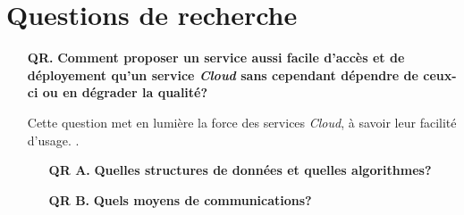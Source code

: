 
\section{Questions de recherche}



\begin{itemize}
\item [\textbf{QR.}] \textbf{Comment proposer un service aussi facile d'accès et
    de déployement qu'un service \emph{Cloud} sans cependant dépendre de
    ceux-ci ou en dégrader la qualité?}
  
  Cette question met en lumière la force des services \emph{Cloud}, à savoir
  leur facilité d'usage. .
  \begin{itemize}
  \item [\textbf{QR A.}] \textbf{Quelles structures de données et quelles
      algorithmes?}
  \item [\textbf{QR B.}] \textbf{Quels moyens de communications?}
  \end{itemize}
\end{itemize}